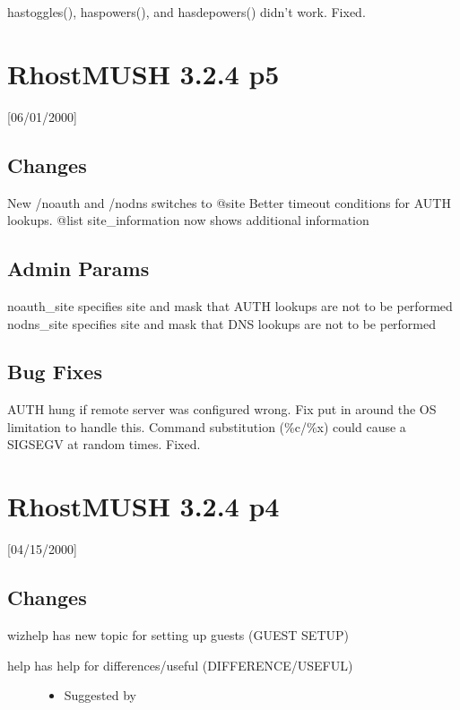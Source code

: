 \documentclass[letterpaper,10pt,english]{sphinxmanual}
\begin{document}
\sphinxAtStartPar
hastoggles(), haspowers(), and hasdepowers() didn’t work.  Fixed.


\section{RhostMUSH 3.2.4 p5}
\label{\detokenize{changelog:rhostmush-3-2-4-p5}}\label{\detokenize{changelog:changelog-3-2-4p5}}
\sphinxAtStartPar
{[}06/01/2000{]}


\subsection{Changes}
\label{\detokenize{changelog:id72}}
\sphinxAtStartPar
New /noauth and /nodns switches to @site
Better timeout conditions for AUTH lookups.
@list site\_information now shows additional information


\subsection{Admin Params}
\label{\detokenize{changelog:id73}}
\sphinxAtStartPar
noauth\_site \textendash{} specifies site and mask that AUTH lookups are not to be performed
nodns\_site  \textendash{} specifies site and mask that DNS lookups are not to be performed


\subsection{Bug Fixes}
\label{\detokenize{changelog:id74}}
\sphinxAtStartPar
AUTH hung if remote server was configured wrong.  Fix put in around the OS
limitation to handle this.
Command substitution (\%c/\%x) could cause a SIGSEGV at random times.  Fixed.


\section{RhostMUSH 3.2.4 p4}
\label{\detokenize{changelog:rhostmush-3-2-4-p4}}\label{\detokenize{changelog:changelog-3-2-4p4}}
\sphinxAtStartPar
{[}04/15/2000{]}


\subsection{Changes}
\label{\detokenize{changelog:id75}}
\sphinxAtStartPar
wizhelp has new topic for setting up guests (GUEST SETUP)
\begin{description}
\item[{help has help for differences/useful (DIFFERENCE/USEFUL)}] \leavevmode\begin{itemize}
\item {} 
\sphinxAtStartPar
Suggested by 

\end{itemize}

\end{description}
\end{document}
